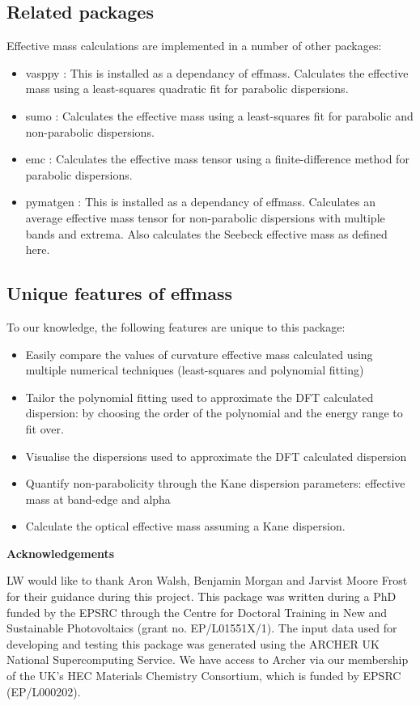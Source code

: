 \subsection*{Related packages}
\label{sec:related}

Effective mass calculations are implemented in a number of other packages:
\begin{itemize}
    \item vasppy \cite{Morgan2018}: This is installed as a dependancy of effmass. Calculates the effective mass using a least-squares quadratic fit for parabolic dispersions.
    \item sumo \cite{Ganose2018}: Calculates the effective mass using a least-squares fit for parabolic and non-parabolic dispersions.
    \item emc \cite{Fornari2012}: Calculates the effective mass tensor using a finite-difference method for parabolic dispersions.
    \item pymatgen \cite{Ong2013}: This is installed as a dependancy of effmass. Calculates an average effective mass tensor for non-parabolic dispersions with multiple bands and extrema. Also calculates the Seebeck effective mass as defined here.
\end{itemize}

\subsection*{Unique features of effmass}
\label{sec:unique}

To our knowledge, the following features are unique to this package:
\begin{itemize}
    \item Easily compare the values of curvature effective mass calculated using multiple numerical techniques (least-squares and polynomial fitting)
    \item Tailor the polynomial fitting used to approximate the DFT calculated dispersion: by choosing the order of the polynomial and the energy range to fit over.
    \item Visualise the dispersions used to approximate the DFT calculated dispersion
    \item Quantify non-parabolicity through the Kane dispersion parameters: effective mass at band-edge and alpha
    \item Calculate the optical effective mass assuming a Kane dispersion.
\end{itemize}

\textbf{Acknowledgements}

LW would like to thank Aron Walsh, Benjamin Morgan and Jarvist Moore Frost for their guidance during this project. This package was written during a PhD funded by the EPSRC through the Centre for Doctoral Training in New and Sustainable Photovoltaics (grant no. EP/L01551X/1). The input data used for developing and testing this package was generated using the ARCHER UK National Supercomputing Service. We have access to Archer via our membership of the UK's HEC Materials Chemistry Consortium, which is funded by EPSRC (EP/L000202).


